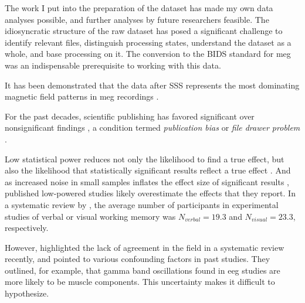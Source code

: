 
The work I put into the preparation of the dataset has made my own data analyses possible, and further analyses by future researchers feasible.
The idiosyncratic structure of the raw dataset has posed a significant challenge to identify relevant files, distinguish processing states, understand the dataset as a whole, and base processing on it.
The conversion to the \gls{BIDS} standard for \gls{meg} was an indispensable prerequisite to working with this data.


It has been demonstrated that the data after \gls{SSS} represents the most dominating magnetic field patterns in \gls{meg} recordings \citep{garces2017choice}.


For the past decades, scientific publishing has favored significant over nonsignificant findings \citep{dwan2008systematic}, a condition termed \textit{publication bias} or \textit{file drawer problem} \citep{rosenthal1979file}.





Low statistical power reduces not only the likelihood to find a true effect, but also the likelihood that statistically significant results reflect a true effect \citep{button2013power}.
And as increased noise in small samples inflates the effect size of significant results \citep{loken2017measurement}, published low-powered studies likely overestimate the effects that they report.
In a systematic review by \citet{pavlov2022oscillatory}, the average number of participants in experimental studies of verbal or visual working memory was $N_{verbal}=19.3$ and $N_{visual}=23.3$, respectively.

However, \citet{pavlov2022oscillatory} highlighted the lack of agreement in the field in a systematic review recently, and pointed to various confounding factors in past studies. They outlined, for example, that gamma band oscillations found in \gls{eeg} studies are more likely to be muscle components.
This uncertainty makes it difficult to hypothesize.
